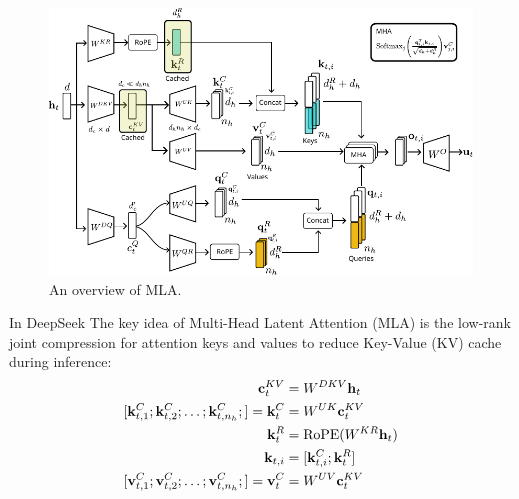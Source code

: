 \begin{figure}[h]
	\centering
	\includegraphics[scale=1.1]{./images/DeepSeek/mla.pdf}
	\caption{An overview of MLA.}
\end{figure}
In DeepSeek The key idea of Multi-Head Latent Attention (MLA) is the low-rank joint compression for attention keys and values to reduce Key-Value (KV) cache during inference:
\begin{align*}
	\rvc_t^{KV} &= W^{DKV}\rvh_t\\
	[\rvk_{t,1}^C; \rvk_{t,2}^C; \dots ;\rvk_{t,n_h}^C;] = \rvk_t^{C} &= W^{UK}\rvc_t^{KV}\\
	\rvk_t^{R} &= \text{RoPE}(W^{KR}\rvh_t)\\
	\rvk_{t,i} &= [\rvk_{t,i}^C;\rvk_t^{R}]\\
	[\rvv_{t,1}^C; \rvv_{t,2}^C; \dots ;\rvv_{t,n_h}^C;] = \rvv_t^{C} &= W^{UV}\rvc_t^{KV}
\end{align*}
